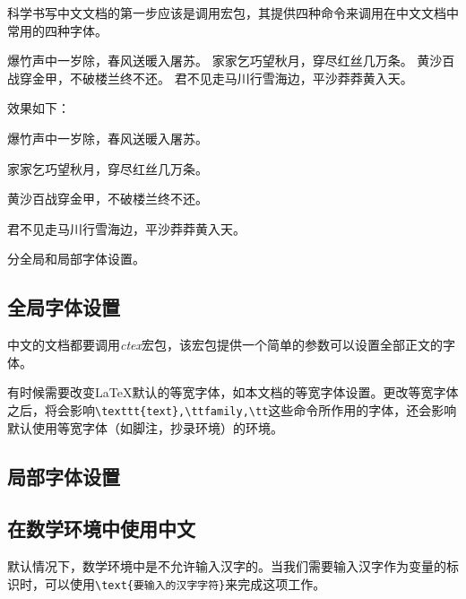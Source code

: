 科学书写中文文档的第一步应该是调用\CTeX 宏包，其提供四种命令来调用在中文文档中常用的四种字体。

\begin{latex}{}
{\songti 爆竹声中一岁除，春风送暖入屠苏。}
{\fangsong 家家乞巧望秋月，穿尽红丝几万条。}
{\heiti 黄沙百战穿金甲，不破楼兰终不还。}
{\kaishu 君不见走马川行雪海边，平沙莽莽黄入天。}
\end{latex}

效果如下：

\begin{center}
	{\songti 爆竹声中一岁除，春风送暖入屠苏。}\par
	{\fangsong 家家乞巧望秋月，穿尽红丝几万条。}\par
	{\heiti 黄沙百战穿金甲，不破楼兰终不还。}\par
	{\kaishu 君不见走马川行雪海边，平沙莽莽黄入天。}
\end{center}

分全局和局部字体设置。
\subsection{全局字体设置}
中文的文档都要调用\emph{ctex}宏包，该宏包提供一个简单的参数可以设置全部正文的字体。

\begin{latex}{}
\setmainfont{Times New Roman}	%
\end{latex}

有时候需要改变\LaTeX 默认的等宽字体，如本文档的等宽字体设置。更改等宽字体之后，将会影响\verb|\texttt{text},\ttfamily,\tt|这些命令所作用的字体，还会影响默认使用等宽字体（如脚注，抄录环境）的环境。

\begin{latex}{}
\setmonofont{Source Code Pro}	%
\end{latex}

\subsection{局部字体设置}

\begin{latex}{}
\newfontfamily{}	%
\end{latex}

\subsection{在数学环境中使用中文}
默认情况下，数学环境中是不允许输入汉字的。当我们需要输入汉字作为变量的标识时，可以使用\verb|\text{要输入的汉字字符}|来完成这项工作。


